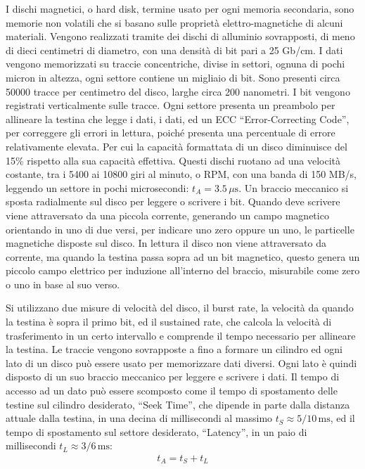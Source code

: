 \documentclass{article}
\numberwithin{equation}{subsection}
\begin{document}
I dischi magnetici, o hard disk, termine usato per ogni memoria secondaria, sono memorie non volatili che si basano sulle proprietà elettro-magnetiche di alcuni materiali. 
Vengono realizzati tramite dei dischi di alluminio sovrapposti, di meno di dieci centimetri di diametro, con una densità di bit pari a 25 Gb/cm. I dati vengono memorizzati su traccie concentriche, divise in 
settori, ognuna di pochi micron in altezza, ogni settore contiene un migliaio di bit. Sono presenti circa 50000 tracce per centimetro del disco, larghe circa 200 nanometri. I bit vengono registrati verticalmente 
sulle tracce. Ogni settore presenta un preambolo per allineare la testina che legge i dati, i dati, ed un ECC ``Error-Correcting Code'', per correggere gli errori in lettura, poiché presenta una percentuale di 
errore relativamente elevata. Per cui la capacità formattata di un disco diminuisce del 15\% rispetto alla sua capacità effettiva. 
Questi dischi ruotano ad una velocità costante, tra i 5400 ai 10800 giri al minuto, o RPM, con una banda di 150 MB/s, leggendo un settore in pochi microsecondi: $t_A=3.5\,\mu\mathrm{s}$. 
Un braccio meccanico si sposta radialmente sul disco per leggere o scrivere i bit. Quando deve scrivere viene attraversato da una piccola corrente, generando un campo magnetico orientando in uno di due versi, per 
indicare uno zero oppure un uno,  le particelle magnetiche disposte sul disco. In lettura il disco non viene attraversato da corrente, ma quando la testina passa sopra ad un bit magnetico, questo genera un piccolo 
campo elettrico per induzione all'interno del braccio, misurabile come zero o uno in base al suo verso. 

Si utilizzano due misure di velocità del disco, il burst rate, la velocità da quando la testina è sopra il primo bit, ed il sustained rate, che calcola la velocità di trasferimento in un certo intervallo e comprende 
il tempo necessario per allineare la testina. Le traccie vengono sovrapposte a fino a formare un cilindro ed ogni lato di un disco può essere usato per memorizzare dati diversi. Ogni lato è quindi disposto di un suo 
braccio meccanico per leggere e scrivere i dati. 
Il tempo di accesso ad un dato può essere scomposto come il tempo di spostamento delle testine sul cilindro desiderato, ``Seek Time'', che dipende in parte dalla distanza attuale dalla testina, in una decina di millisecondi al massimo 
$t_S\approx5/10\,\mathrm{ms}$, ed il tempo di spostamento sul settore desiderato, ``Latency'', in un paio di millisecondi $t_L\approx3/6\,\mathrm{ms}$:
\begin{gather*}
    t_A=t_S+t_L
\end{gather*}
\end{document}
